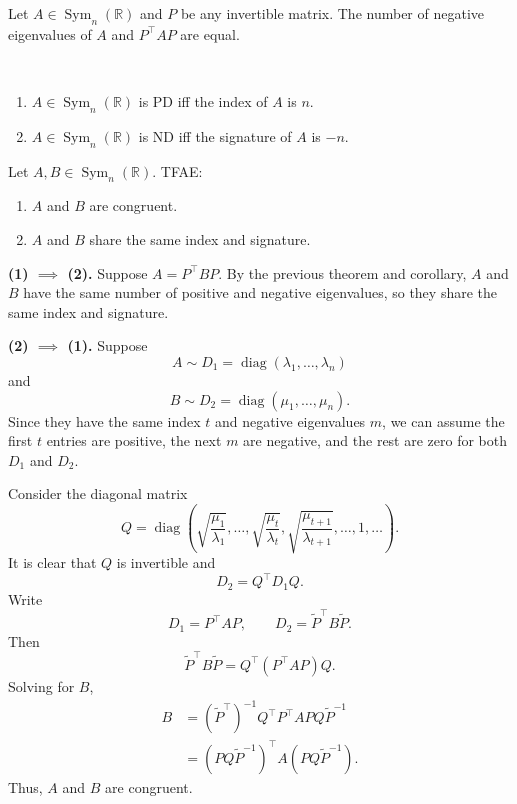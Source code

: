 \begin{corollary}
Let $A\in \operatorname{Sym}_n(\mathbb{R})$ and $P$ be any invertible matrix. The number of negative eigenvalues of $A$ and $P^\top AP$ are equal.
\end{corollary}

\begin{corollary}\ \vspace{-2em}
\begin{enumerate}
	\item $A\in \operatorname{Sym}_n(\mathbb{R})$ is PD iff the index of $A$ is $n$.
	\item $A\in \operatorname{Sym}_n(\mathbb{R})$ is ND iff the signature of $A$ is $-n$.
\end{enumerate}
\end{corollary}

\begin{theorem}
Let $A,B\in \operatorname{Sym}_n(\mathbb{R})$. TFAE:
\begin{enumerate}
    \item[(1)] $A$ and $B$ are congruent.
    \item[(2)] $A$ and $B$ share the same index and signature.
\end{enumerate}
\end{theorem}

\begin{pfbox}
\textbf{(1) $\implies$ (2).}
Suppose $A=P^\top BP$.
By the previous theorem and corollary, $A$ and $B$ have the same number of positive and negative eigenvalues, so they share the same index and signature.

\medskip

\textbf{(2) $\implies$ (1).}
Suppose
\[
A\sim D_1=\operatorname{diag}(\lambda_1,\dots,\lambda_n)
\]
and
\[
B\sim D_2=\operatorname{diag}(\mu_1,\dots,\mu_n).
\]
Since they have the same index $t$ and negative eigenvalues $m$, we can assume the first $t$ entries are positive, the next $m$ are negative, and the rest are zero for both $D_1$ and $D_2$.

Consider the diagonal matrix
\[
Q
=
\operatorname{diag}
\left(
\sqrt{\frac{\mu_1}{\lambda_1}},
\dots,
\sqrt{\frac{\mu_t}{\lambda_t}},
\sqrt{\frac{\mu_{t+1}}{\lambda_{t+1}}},
\dots,
1,
\dots
\right).
\]
It is clear that $Q$ is invertible and
\[
D_2=Q^\top D_1Q.
\]
Write
\[
D_1=P^\top AP,
\qquad
D_2=\widetilde{P}^{\top}B\widetilde{P}.
\]
Then
\[
\widetilde{P}^{\top}B\widetilde{P}
=
Q^\top(P^\top AP)Q.
\]
Solving for $B$,
\begin{align*}
B
&=
(\widetilde{P}^{\top})^{-1}Q^\top P^\top APQ\widetilde{P}^{-1} \\
&=
(PQ\widetilde{P}^{-1})^\top A(PQ\widetilde{P}^{-1}).
\end{align*}
Thus, $A$ and $B$ are congruent.
\end{pfbox}


